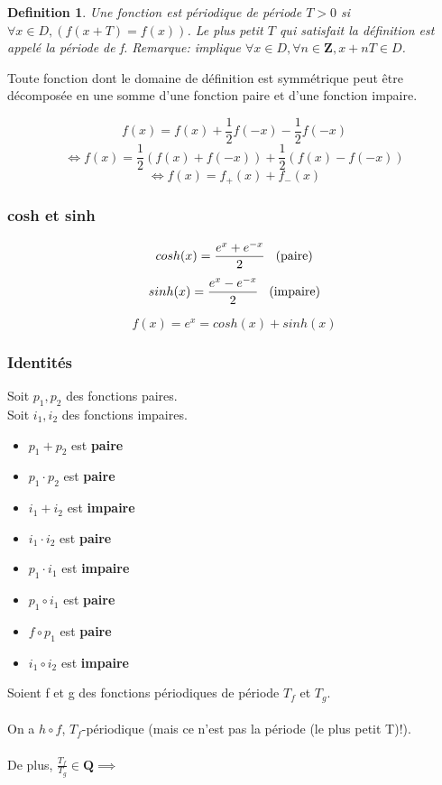 \documentclass{article}
\newtheorem{definition}{Definition}[section]
\begin{document}
\begin{definition}
    Une fonction est périodique de période $ T > 0 $ si $ \forall x \in D, (f(x+T) = f(x)) $. Le plus petit $ T $ qui satisfait la définition est appelé la période de f. Remarque: implique $ \forall x \in D, \forall n \in \mathbf{Z}, x + nT \in D$. 
\end{definition}

Toute fonction dont le domaine de définition est symmétrique peut être décomposée en une somme d'une fonction paire et d'une fonction impaire.

\[ f(x) = f(x) + \frac{1}{2} f(-x) - \frac{1}{2} f(-x) \]
\[ \Leftrightarrow f(x) = \frac{1}{2}(f(x) + f(-x)) + \frac{1}{2}(f(x) - f(-x)) \]
\[ \Leftrightarrow f(x) = f_{+}(x) + f_{-}(x) \]

\subsubsection{cosh et sinh}

\[ cosh(x) = \frac{e^x + e^{-x}}{2} \hspace{0.3cm} \text{(paire)} \]
\[ sinh(x) = \frac{e^x - e^{-x}}{2} \hspace{0.3cm} \text{(impaire)}\]

\[ f(x) = e^x = cosh(x) + sinh(x) \]

\subsubsection{Identités}

Soit $ p_1, p_2 $ des fonctions paires.\\
Soit $ i_1, i_2 $ des fonctions impaires.

\begin{itemize}
    \item $ p_1 + p_2 $ est \textbf{paire}
    \item $ p_1 \cdot p_2 $ est \textbf{paire}
    \item $ i_1 + i_2 $ est \textbf{impaire}
    \item $ i_1 \cdot i_2 $ est \textbf{paire}
    \item $ p_1 \cdot i_1 $ est \textbf{impaire}
    \item $ p_1 \circ i_1 $ est \textbf{paire}
    \item $ f \circ p_1 $ est \textbf{paire}
    \item $ i_1 \circ i_2 $ est \textbf{impaire}
\end{itemize}
Soient f et g des fonctions périodiques de période $ T_f $ et $ T_g $.\\\\
On a $ h\circ f$, $ T_f $-périodique (mais ce n'est pas la période (le plus petit T)!).\\\\
De plus, $ \frac{T_f}{T_g} \in \mathbf{Q} \implies $
\end{document}

